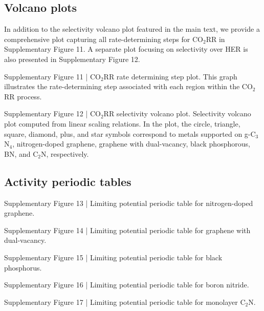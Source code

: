 \subsection{Volcano plots}
In addition to the selectivity volcano plot featured in the main text, we provide a comprehensive plot capturing all rate-determining steps for CO$_2$RR in Supplementary Figure 11. A separate plot focusing on selectivity over HER is also presented in Supplementary Figure 12.


Supplementary Figure 11 | CO$_2$RR rate determining step plot. This graph illustrates the rate-determining step associated with each region within the CO$_2$RR process.


Supplementary Figure 12 | CO$_2$RR selectivity volcano plot. Selectivity volcano plot computed from linear scaling relations. In the plot, the circle, triangle, square, diamond, plus, and star symbols correspond to metals supported on g-C$_3$N$_4$, nitrogen-doped graphene, graphene with dual-vacancy, black phosphorous, BN, and C$_2$N, respectively.


\subsection{Activity periodic tables}


Supplementary Figure 13 | Limiting potential periodic table for nitrogen-doped graphene.


Supplementary Figure 14 | Limiting potential periodic table for graphene with dual-vacancy.


Supplementary Figure 15 | Limiting potential periodic table for black phosphorus.


Supplementary Figure 16 | Limiting potential periodic table for boron nitride.


Supplementary Figure 17 | Limiting potential periodic table for monolayer C$_2$N.
